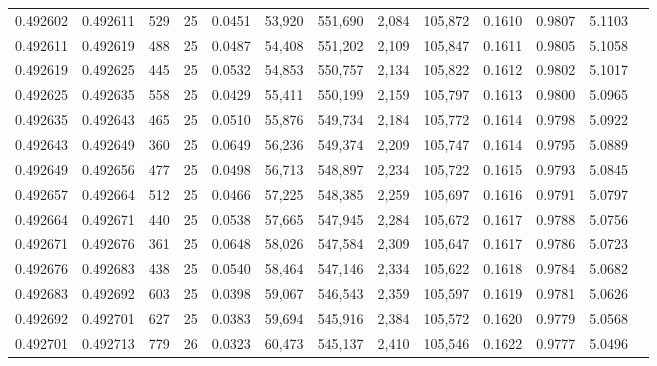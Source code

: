 \begin{tabular}{rrrrrrrrrrrrr}
0.492602 & 0.492611 &   529 &  25 &                                     0.0451 &  53,920 & 551,690 &   2,084 & 105,872 & 0.1610 & 0.9807 & 5.1103 \\
0.492611 & 0.492619 &   488 &  25 &                                     0.0487 &  54,408 & 551,202 &   2,109 & 105,847 & 0.1611 & 0.9805 & 5.1058 \\
0.492619 & 0.492625 &   445 &  25 &                                     0.0532 &  54,853 & 550,757 &   2,134 & 105,822 & 0.1612 & 0.9802 & 5.1017 \\
0.492625 & 0.492635 &   558 &  25 &                                     0.0429 &  55,411 & 550,199 &   2,159 & 105,797 & 0.1613 & 0.9800 & 5.0965 \\
0.492635 & 0.492643 &   465 &  25 &                                     0.0510 &  55,876 & 549,734 &   2,184 & 105,772 & 0.1614 & 0.9798 & 5.0922 \\
0.492643 & 0.492649 &   360 &  25 &                                     0.0649 &  56,236 & 549,374 &   2,209 & 105,747 & 0.1614 & 0.9795 & 5.0889 \\
0.492649 & 0.492656 &   477 &  25 &                                     0.0498 &  56,713 & 548,897 &   2,234 & 105,722 & 0.1615 & 0.9793 & 5.0845 \\
0.492657 & 0.492664 &   512 &  25 &                                     0.0466 &  57,225 & 548,385 &   2,259 & 105,697 & 0.1616 & 0.9791 & 5.0797 \\
0.492664 & 0.492671 &   440 &  25 &                                     0.0538 &  57,665 & 547,945 &   2,284 & 105,672 & 0.1617 & 0.9788 & 5.0756 \\
0.492671 & 0.492676 &   361 &  25 &                                     0.0648 &  58,026 & 547,584 &   2,309 & 105,647 & 0.1617 & 0.9786 & 5.0723 \\
0.492676 & 0.492683 &   438 &  25 &                                     0.0540 &  58,464 & 547,146 &   2,334 & 105,622 & 0.1618 & 0.9784 & 5.0682 \\
0.492683 & 0.492692 &   603 &  25 &                                     0.0398 &  59,067 & 546,543 &   2,359 & 105,597 & 0.1619 & 0.9781 & 5.0626 \\
0.492692 & 0.492701 &   627 &  25 &                                     0.0383 &  59,694 & 545,916 &   2,384 & 105,572 & 0.1620 & 0.9779 & 5.0568 \\
0.492701 & 0.492713 &   779 &  26 &                                     0.0323 &  60,473 & 545,137 &   2,410 & 105,546 & 0.1622 & 0.9777 & 5.0496 \\

\end{tabular}
